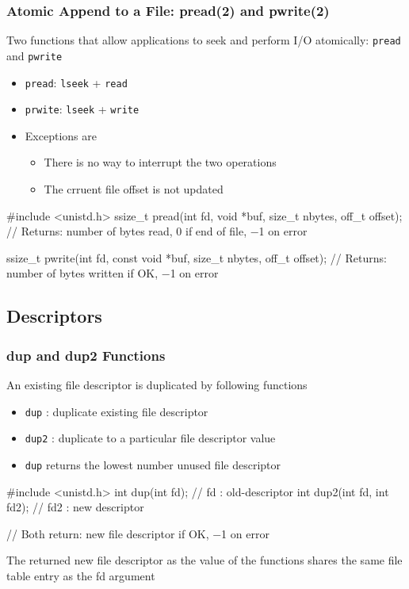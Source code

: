 \documentclass[newPxFont,sthlmFooter,nooffset]{beamer}
\begin{document}
\begin{frame}[containsverbatim,t]
  \frametitle{Atomic Append to a  File: pread(2) and pwrite(2)}

Two functions that allow applications to seek and perform I/O atomically: \texttt{pread} and \texttt{pwrite}
\begin{itemize}
\item \texttt{pread}: \texttt{lseek} + \texttt{read}
\item \texttt{prwite}: \texttt{lseek} + \texttt{write}
\item Exceptions are
  \begin{itemize}
  \item There is no way to interrupt the two operations
  \item The crruent file offset is not updated
  \end{itemize}
\end{itemize}

\begin{codedef}
#include <unistd.h>
ssize_t pread(int fd, void *buf, size_t nbytes, off_t offset);
// Returns: number of bytes read, 0 if end of file, −1 on error

ssize_t pwrite(int fd, const void *buf, size_t nbytes, off_t offset);
// Returns: number of bytes written if OK, −1 on error
\end{codedef}
\end{frame}


\subsection{Descriptors}
\begin{frame}[containsverbatim,t]
  \frametitle{dup and dup2 Functions}

An existing file descriptor is duplicated by following functions
\begin{itemize}
\item \texttt{dup} : duplicate existing file descriptor
\item \texttt{dup2} : duplicate to a particular file descriptor value
\item \texttt{dup} returns the lowest number unused file descriptor
\end{itemize}
\begin{codedef}
#include <unistd.h>
int dup(int fd); // fd : old-descriptor
int dup2(int fd, int fd2); // fd2 : new descriptor

// Both return: new file descriptor if OK, −1 on error
\end{codedef}

\bigskip
The returned new file descriptor as the value of the functions shares the same file table entry as the fd argument

\end{frame}
\end{document}

